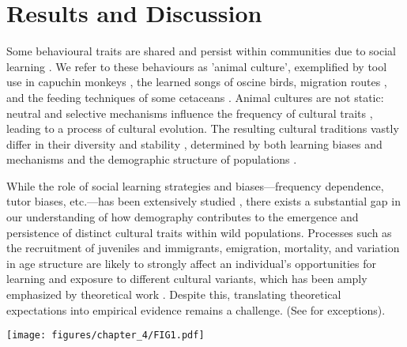 \section{Results and Discussion}

Some behavioural traits are shared and persist within communities due to social learning \parencite{viciana2021}. We refer to these behaviours as 'animal culture', exemplified by tool use in capuchin monkeys \parencite{falotico2019}, the learned songs of oscine birds, migration routes \parencite{jesmer2018, berdahl2018, byholm2022}, and the feeding techniques of some cetaceans \parencite{allen2013, rendell2001}. Animal cultures are not static: neutral and selective mechanisms influence the frequency of cultural traits \parencite{potvin2015, williams2021}, leading to a process of cultural evolution. The resulting cultural traditions vastly differ in their diversity and stability \parencite{tchernichovski2017}, determined by both learning biases and mechanisms and the demographic structure of populations \parencite{deffner2022a, kandler2017}. 

While the role of social learning strategies and biases---frequency dependence, tutor biases, etc.---has been extensively studied \parencite{pike2010, kendal2015, aplin2017, lachlan2018, tchernichovski2021}, there exists a substantial gap in our understanding of how demography contributes to the emergence and persistence of distinct cultural traits within wild populations. Processes such as the recruitment of juveniles and immigrants, emigration, mortality, and variation in age structure are likely to strongly affect an individual's opportunities for learning and exposure to different cultural variants, which has been amply emphasized by theoretical work \parencite{deffner2022a, deffner2022, kandler2023, fogarty2019, deffner2020, derex2016, kirby2021, nunn2009, barta2023}. Despite this, translating theoretical expectations into empirical evidence remains a challenge. (See \cite{chimento2021, fayet2014} for exceptions). 


\begin{figure*}[hbt!]
    \centering
    \texttt{[image: figures/chapter\_4/FIG1.pdf]}
    \label{c4_fig:main}
\end{figure*}


